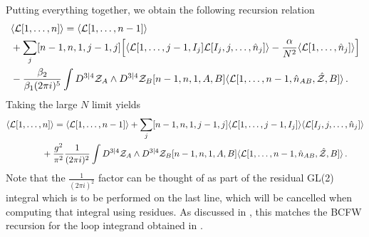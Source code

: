 \documentclass[12pt]{article}
\numberwithin{equation}{section}
\begin{document}
Putting everything together, we obtain the following recursion relation 
\begin{align}
&\langle \mathcal{L}[1,\ldots,n] \rangle = \langle \mathcal{L}[1,\ldots,n-1]\rangle  \notag \\ 
&+\sum_j [n-1,n,1,j-1,j] \Bigl[\langle \mathcal{L}[1,\ldots,j-1,I_j]  \mathcal{L}[I_j,j,\ldots,\hat{n}_j]\rangle -\frac{\alpha}{N^2} \langle \mathcal{L}[1,\ldots,\hat{n}_j] \rangle \Bigr] \notag \\
&-\frac{\beta_2}{\beta_1  (2 \pi i)^5} \int D^{3|4}\mathcal{Z}_A \wedge D^{3|4}\mathcal{Z}_B [n-1,n,1,A,B] \langle \mathcal{L}[1,\ldots,n-1,\hat{n}_{AB},\hat{\mathcal{Z}},B] \rangle \,.
\end{align}
Taking the large $N$ limit yields 
\begin{align}
&\langle \mathcal{L}[1,\ldots,n] \rangle = \langle \mathcal{L}[1,\ldots,n-1]\rangle  + \sum_j [n-1,n,1,j-1,j] \langle \mathcal{L}[1,\ldots,j-1,I_j] \rangle \langle  \mathcal{L}[I_j,j,\ldots,\hat{n}_j]\rangle  \notag \\
&\qquad \qquad +\frac{ g^2}{\pi^2} \frac{1}{(2 \pi i)^2} \int D^{3|4}\mathcal{Z}_A \wedge D^{3|4}\mathcal{Z}_B [n-1,n,1,A,B] \langle \mathcal{L}[1,\ldots,n-1,\hat{n}_{AB},\hat{\mathcal{Z}},B] \rangle \,.
\end{align}
Note that the \(\frac{1}{(2 \pi i)^2}\) factor can be thought of as part of the residual GL(2) integral which is to be performed on the last line, which will be cancelled when computing that integral using residues. As discussed in \cite{Bullimore:2011ni}, this matches the BCFW recursion for the loop integrand obtained in \cite{Arkani-Hamed:2010zjl}.
\end{document}
